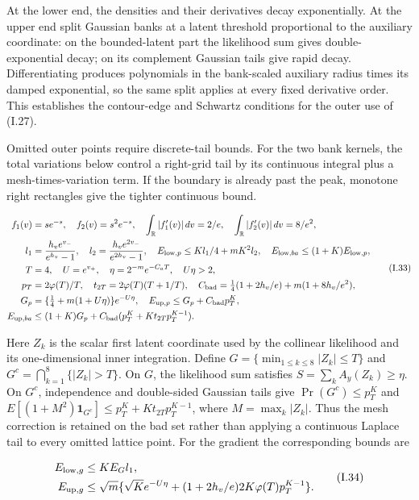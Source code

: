 \documentclass{article}
\begin{document}
At the lower end, the densities and their derivatives decay
exponentially. At the upper end split Gaussian banks at a latent
threshold proportional to the auxiliary coordinate: on the
bounded-latent part the likelihood sum gives double-exponential decay;
on its complement Gaussian tails give rapid decay. Differentiating
produces polynomials in the bank-scaled auxiliary radius times its
damped exponential, so the same split applies at every fixed derivative
order. This establishes the contour-edge and Schwartz conditions for the
outer use of (I.27).

Omitted outer points require discrete-tail bounds. For the two bank
kernels, the total variations below control a right-grid tail by its
continuous integral plus a mesh-times-variation term. If the boundary is
already past the peak, monotone right rectangles give the tighter
continuous bound.

\[
\begin{aligned}
f_1(v)&=se^{-s},\quad f_2(v)=s^2e^{-s},\quad
\int_{\mathbb R}|f_1'(v)|\,dv=2/e,\quad\int_{\mathbb R}|f_2'(v)|\,dv=8/e^2,\\
l_1&=\frac{h_ve^{v_-}}{e^{h_v}-1},\quad l_2=\frac{h_ve^{2v_-}}{e^{2h_v}-1},\quad
E_{{\rm low},p}\le Kl_1/4+mK^2l_2,\quad E_{{\rm low},ba}\le(1+K)E_{{\rm low},p},\\
T&=4,\quad U=e^{v_+},\quad\eta=2^{-m}e^{-C_aT},\quad U\eta>2,\\
p_T&=2\varphi(T)/T,\quad t_{2T}=2\varphi(T)(T+1/T),\quad
C_{\rm bad}=\tfrac14(1+2h_v/e)+m(1+8h_v/e^2),\\
G_p&=\{\tfrac14+m(1+U\eta)\}e^{-U\eta},\quad
E_{{\rm up},p}\le G_p+C_{\rm bad}p_T^K,\\
E_{{\rm up},ba}&\le(1+K)G_p+C_{\rm bad}(p_T^K+Kt_{2T}p_T^{K-1}).
\end{aligned}
\tag{I.33}
\]

Here \(Z_k\) is the scalar first latent coordinate used by the collinear
likelihood and its one-dimensional inner integration. Define
\(G=\{\min_{1\le k\le8}|Z_k|\le T\}\) and
\(G^c=\bigcap_{k=1}^8\{|Z_k|>T\}\). On \(G\), the likelihood sum
satisfies \(S=\sum_k A_y(Z_k)\ge\eta\). On \(G^c\), independence and
double-sided Gaussian tails give \(\Pr(G^c)\le p_T^K\) and
\(E[(1+M^2)\mathbf1_{G^c}]\le p_T^K+Kt_{2T}p_T^{K-1}\), where
\(M=\max_k|Z_k|\). Thus the mesh correction is retained on the bad set
rather than applying a continuous Laplace tail to every omitted lattice
point. For the gradient the corresponding bounds are

\[
\begin{aligned}
E_{{\rm low},g}&\le KE_Gl_1,\\
E_{{\rm up},g}&\le\sqrt m\{\sqrt K e^{-U\eta}+(1+2h_v/e)2K\varphi(T)p_T^{K-1}\}.
\end{aligned}
\tag{I.34}
\]
\end{document}
